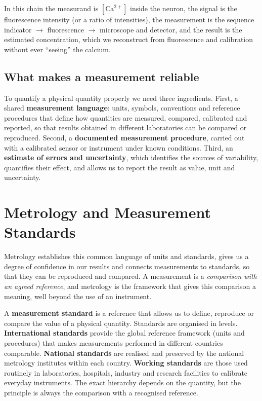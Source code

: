 \documentclass[letterpaper,11pt,leqno]{book}
\begin{document}
In this chain the measurand is $[\text{Ca}^{2+}]$ inside the neuron, the signal is the fluorescence intensity (or a ratio of intensities), the measurement is the sequence indicator $\to$ fluorescence $\to$ microscope and detector, and the result is the estimated concentration, which we reconstruct from fluorescence and calibration without ever ``seeing'' the calcium.

\subsection*{What makes a measurement reliable}

To quantify a physical quantity properly we need three ingredients. First, a shared \textbf{measurement language}: units, symbols, conventions and reference procedures that define how quantities are measured, compared, calibrated and reported, so that results obtained in different laboratories can be compared or reproduced. Second, a \textbf{documented measurement procedure}, carried out with a calibrated sensor or instrument under known conditions. Third, an \textbf{estimate of errors and uncertainty}, which identifies the sources of variability, quantifies their effect, and allows us to report the result as value, unit and uncertainty.

\section{Metrology and Measurement Standards}
\label{sec:standards}

Metrology establishes this common language of units and standards, gives us a degree of confidence in our results and connects measurements to standards, so that they can be reproduced and compared. A measurement is a \emph{comparison with an agreed reference}, and metrology is the framework that gives this comparison a meaning, well beyond the use of an instrument.

A \textbf{measurement standard} is a reference that allows us to define, reproduce or compare the value of a physical quantity. Standards are organised in levels. \textbf{International standards} provide the global reference framework (units and procedures) that makes measurements performed in different countries comparable. \textbf{National standards} are realised and preserved by the national metrology institutes within each country. \textbf{Working standards} are those used routinely in laboratories, hospitals, industry and research facilities to calibrate everyday instruments. The exact hierarchy depends on the quantity, but the principle is always the comparison with a recognised reference.
\end{document}
